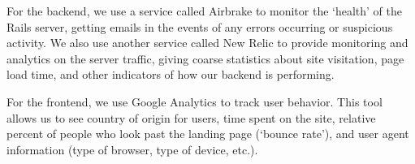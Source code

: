 For the backend, we use a service called Airbrake to monitor the `health' of the Rails server, getting emails in the events of any errors occurring or suspicious activity. We also use another service called New Relic to provide monitoring and analytics on the server traffic, giving coarse statistics about site visitation, page load time, and other indicators of how our backend is performing.

For the frontend, we use Google Analytics to track user behavior. This tool allows us to see country of origin for users, time spent on the site, relative percent of people who look past the landing page (`bounce rate'), and user agent information (type of browser, type of device, etc.).








